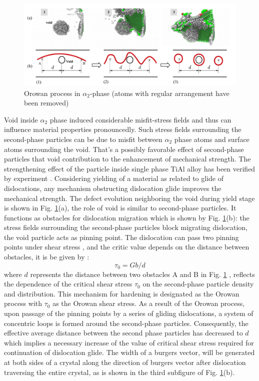 \documentclass[Unknown,article,submit,moreauthors,pdftex,10pt,a4paper]{Definitions/mdpi}
\begin{document}
\begin{figure}[ht]
	\centering
	\includegraphics[width=1\linewidth]{"img/orowan"}
	\caption{Orowan process in $\alpha_2$-phase (atoms with regular arrangement have been removed)}
	\label{fig:orowan}
\end{figure}
Void inside $\alpha_2$ phase induced considerable misfit-stress fields and thus can influence material properties pronouncedly. Such stress fields surrounding the second-phase particles can be due to misfit between $\alpha_2$ phase atoms and surface atoms surrounding the void. That's a possibly favorable effect of second-phase particles that void contribution to the enhancement of mechanical strength. The strengthening effect of the particle inside single phase TiAl alloy has been verified by experiment \cite{Zghal1998}. Considering yielding of a material as related to glide of dislocations, any mechanism obstructing dislocation glide improves the mechanical strength. The defect evolution neighboring the void during yield stage is shown in Fig. \ref{fig:orowan}(a), the role of void is similar to second-phase particles. It functions as obstacles for dislocation migration which is shown by Fig. \ref{fig:orowan}(b): the stress fields surrounding the second-phase particles block migrating dislocation, the void particle acts as pinning point. The dislocation can pass two pinning points under shear  stress , and the critic value depends on the distance between  obstacles, it is be given by \cite{Xiong2015}:
\begin{equation} \label{eq:orowan} 
\tau_0 = Gb/d
\end{equation}
where $d$ represents the distance between two obstacles A and B in Fig. \ref{fig:orowan} , reflects the dependence of the critical shear stress $\tau_0$ on the second-phase particle density and distribution. This mechanism for hardening is designated as the Orowan process with $\tau_0$ as the Orowan shear stress. As a result of the Orowan process, upon passage of the pinning points by a series of gliding dislocations, a system of concentric loops is formed around the second-phase particles. Consequently, the effective average distance between the second phase particles has decreased to $d$ which implies a necessary increase of the value of critical shear stress required for continuation of dislocation glide. The width of a burgers vector, will be generated at both sides of a crystal along the direction of burgers vector after dislocation traversing the entire crystal, as is shown in the third subfigure of Fig. \ref{fig:orowan}(b). 
\end{document}
